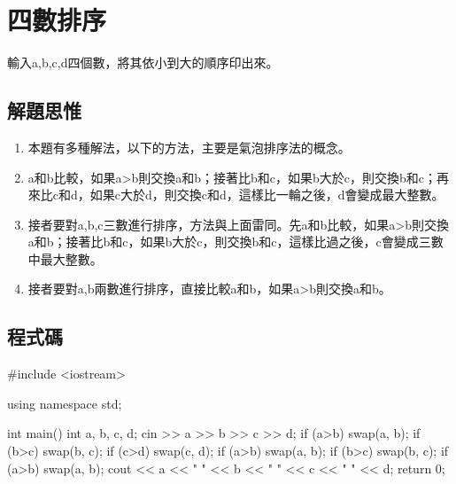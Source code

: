 \section{四數排序}
輸入a,b,c,d四個數，將其依小到大的順序印出來。

\subsection{解題思惟}
\begin{enumerate}
	\item 本題有多種解法，以下的方法，主要是氣泡排序法的概念。
	\item a和b比較，如果a>b則交換a和b；接著比b和c，如果b大於c，則交換b和c；再來比c和d，如果c大於d，則交換c和d，這樣比一輪之後，d會變成最大整數。
	\item 接者要對a,b,c三數進行排序，方法與上面雷同。先a和b比較，如果a>b則交換a和b；接著比b和c，如果b大於c，則交換b和c，這樣比過之後，c會變成三數中最大整數。
	\item 接者要對a,b兩數進行排序，直接比較a和b，如果a>b則交換a和b。
\end{enumerate}
			
\subsection{程式碼}
\begin{cppcode}
	#include <iostream>
	
	using namespace std;
	
	int main()
	{
		int a, b, c, d;
		cin >> a >> b >> c >> d;
		if (a>b) swap(a, b);
		if (b>c) swap(b, c);
		if (c>d) swap(c, d);
		if (a>b) swap(a, b);
		if (b>c) swap(b, c);
		if (a>b) swap(a, b);
		cout << a << " " << b << " " << c << " " << d;
		return 0;
	}
	
\end{cppcode}
